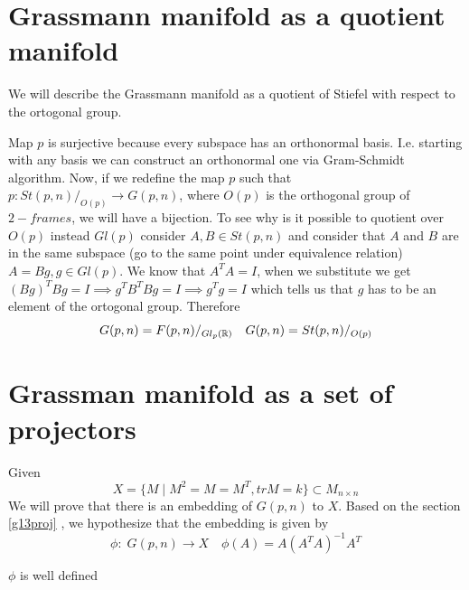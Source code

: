 \documentclass[11pt,a4paper]{report}
\begin{document}
\section{Grassmann manifold as a quotient manifold } \label{grassquot}
We will describe the Grassmann manifold as a quotient of Stiefel with respect to the ortogonal group.
\begin{center}
\end{center}
Map $p$ is surjective because every subspace has an orthonormal basis.
I.e. starting with any basis we can construct an orthonormal one via Gram-Schmidt algorithm.
Now, if we redefine the map $p$ such that $p: { St(p,n) / _{O(p)}} \to G(p,n)$, where $O(p)$
is the orthogonal group of $2-frames$, we will have a bijection. 
To see why is it possible to quotient over $O(p)$ instead $Gl(p)$ consider $A,B \in St(p,n)$ and consider that $A$ and $B$ are in the same subspace (go to the same point under equivalence relation) $A = B g, g \in Gl(p)$.
We know that $ A^T A = I $, when we substitute we get $ (Bg)^T Bg = I \implies g^T B^T B g = I \implies g^T g = I$ which tells us that $g$ has to be an element of the ortogonal group.
Therefore 
$$ G(p,n) = F(p,n) / _{Gl_p(\mathbb{R})} \quad G(p,n) = St(p,n) / _{O(p) }$$
\section{Grassman manifold as a set of projectors }
Given
$$ X = \{ M \; | \; M^2 = M = M^T, trM=k \} \subset M_{n \times n} $$
We will prove that there is an embedding of $G(p,n)$ to $X$.
Based on the section \ref{g13proj} , we hypothesize that the embedding is given by
$$ \phi: \; G(p,n) \to X \quad \phi(A) = A(A^T A)^{-1} A^T  $$

\begin{Prop}
    $\phi$ is well defined
\end{Prop}
\end{document}
